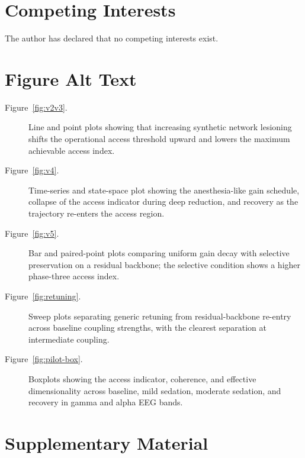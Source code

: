 ﻿\documentclass[11pt,a4paper]{article}
\theoremstyle{plain}
\theoremstyle{definition}
\theoremstyle{remark}
\begin{document}
\section*{Competing Interests}

The author has declared that no competing interests exist.

\section*{Figure Alt Text}

\begin{description}
\item[Figure~\ref{fig:v2v3}.] Line and point plots showing that increasing synthetic network lesioning shifts the operational access threshold upward and lowers the maximum achievable access index.
\item[Figure~\ref{fig:v4}.] Time-series and state-space plot showing the anesthesia-like gain schedule, collapse of the access indicator during deep reduction, and recovery as the trajectory re-enters the access region.
\item[Figure~\ref{fig:v5}.] Bar and paired-point plots comparing uniform gain decay with selective preservation on a residual backbone; the selective condition shows a higher phase-three access index.
\item[Figure~\ref{fig:retuning}.] Sweep plots separating generic retuning from residual-backbone re-entry across baseline coupling strengths, with the clearest separation at intermediate coupling.
\item[Figure~\ref{fig:pilot-box}.] Boxplots showing the access indicator, coherence, and effective dimensionality across baseline, mild sedation, moderate sedation, and recovery in gamma and alpha EEG bands.
\end{description}

\section*{Supplementary Material}
\end{document}
